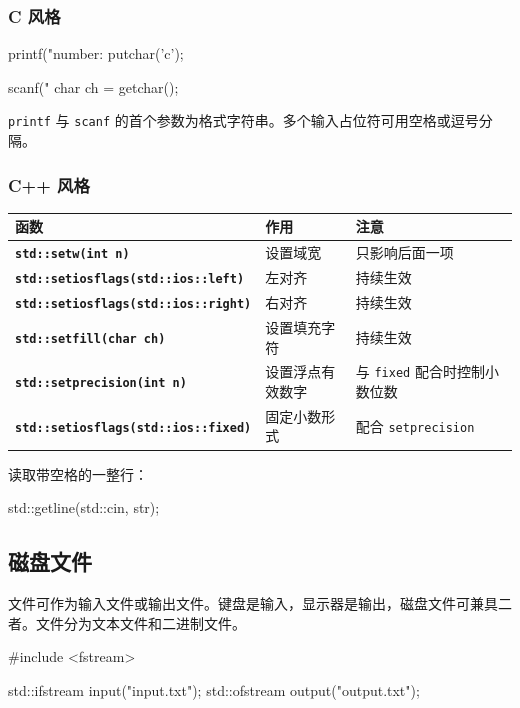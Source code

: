 \documentclass[UTF8,fontset=fandol,zihao=5]{ctexart}
\newcommand{\code}[1]{\texttt{#1}}
\begin{document}
\subsubsection{C 风格}

\begin{cppcode}[C 风格输入输出]
printf("number: %
putchar('c');

scanf("%
char ch = getchar();
\end{cppcode}

\code{printf} 与 \code{scanf} 的首个参数为格式字符串。多个输入占位符可用空格或逗号分隔。

\subsubsection{C++ 风格}

\begin{center}
\begin{tabularx}{0.96\textwidth}{>{\bfseries}p{6.5cm}X X}
\toprule
函数 & 作用 & 注意 \\
\midrule
\code{std::setw(int n)} & 设置域宽 & 只影响后面一项 \\
\code{std::setiosflags(std::ios::left)} & 左对齐 & 持续生效 \\
\code{std::setiosflags(std::ios::right)} & 右对齐 & 持续生效 \\
\code{std::setfill(char ch)} & 设置填充字符 & 持续生效 \\
\code{std::setprecision(int n)} & 设置浮点有效数字 & 与 \code{fixed} 配合时控制小数位数 \\
\code{std::setiosflags(std::ios::fixed)} & 固定小数形式 & 配合 \code{setprecision} \\
\bottomrule
\end{tabularx}
\end{center}

读取带空格的一整行：

\begin{cppcode}
std::getline(std::cin, str);
\end{cppcode}

\subsection{磁盘文件}

文件可作为输入文件或输出文件。键盘是输入，显示器是输出，磁盘文件可兼具二者。文件分为文本文件和二进制文件。

\begin{cppcode}[文件流]
#include <fstream>

std::ifstream input("input.txt");
std::ofstream output("output.txt");
\end{cppcode}
\end{document}
